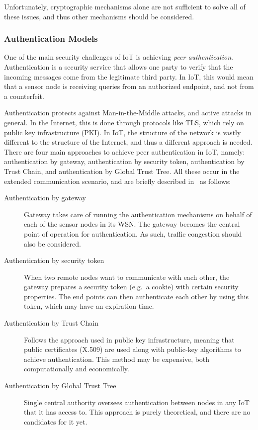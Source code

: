 \documentclass[12pt]{article}
\begin{document}
Unfortunately, cryptographic mechanisms alone are not sufficient to solve all of these issues, and thus other mechanisms should be considered.

\subsubsection{Authentication Models}

One of the main security challenges of IoT is achieving \emph{peer authentication}. Authentication is a security service that allows one party to verify that the incoming messages come from the legitimate third party. In IoT, this would mean that a sensor node is receiving queries from an authorized endpoint, and not from a counterfeit.

Authentication protects against Man-in-the-Middle attacks, and active attacks in general. In the Internet, this is done through protocols like TLS, which rely on public key infrastructure (PKI). In IoT, the structure of the network is vastly different to the structure of the Internet, and thus a different approach is needed. There are four main approaches to achieve peer authentication in IoT, namely: authentication by gateway, authentication by security token, authentication by Trust Chain, and authentication by Global Trust Tree. All these occur in the extended communication scenario, and are briefly described in~\cite{Zhang:2015} as follows:
\begin{description}
\item[Authentication by gateway] Gateway takes care of running the authentication mechanisms on behalf of each of the sensor nodes in its WSN. The gateway becomes the central point of operation for authentication. As such, traffic congestion should also be considered.
\item[Authentication by security token] When two remote nodes want to communicate with each other, the gateway prepares a security token (e.g.\ a cookie) with certain security properties. The end points can then authenticate each other by using this token, which may have an expiration time. 
\item[Authentication by Trust Chain] Follows the approach used in public key infrastructure, meaning that public certificates (X.509) are used along with public-key algorithms to achieve authentication. This method may be expensive, both computationally and economically.
\item[Authentication by Global Trust Tree] Single central authority oversees authentication between nodes in any IoT that it has access to. This approach is purely theoretical, and there are no candidates for it yet.
\end{description}
\end{document}
